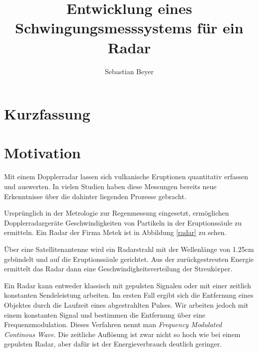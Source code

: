 \documentclass[12pt,a4paper]{scrartcl}
\begin{document}
\title {Entwicklung eines Schwingungsmesssystems für ein Radar}
\author{Sebastian Beyer}
\maketitle
\thispagestyle{empty}
\newpage

\tableofcontents
\thispagestyle{empty}
\newpage




\section{Kurzfassung}

\newpage

\section{Motivation}

Mit einem Dopplerradar lassen sich vulkanische Eruptionen quantitativ erfassen und auswerten. In vielen Studien haben diese Messungen bereits neue Erkenntnisse über die dahinter liegenden Prozesse gebracht. 

Ursprünglich in der Metrologie zur Regenmessung eingesetzt, ermöglichen Dopplerradargeräte Geschwindigkeiten von Partikeln in der Eruptionssäule zu ermitteln. Ein Radar der Firma Metek ist in Abbildung \ref{radar} zu sehen.

Über eine Satellitenantenne wird ein Radarstrahl mit der Wellenlänge von 1.25cm gebündelt und auf die Eruptionssäule gerichtet.
Aus der zurückgestreuten Energie ermittelt das Radar dann eine Geschwindigkeitsverteilung der Streukörper. 

Ein Radar kann entweder klassisch mit gepulsten Signalen oder mit einer zeitlich konstanten Sendeleistung arbeiten.
Im ersten Fall ergibt sich die Entfernung eines Objektes durch die Laufzeit eines abgestrahlten Pulses. 
Wir arbeiten jedoch mit einem konstanten Signal und bestimmen die Entfernung über eine Frequenzmodulation. Dieses Verfahren nennt man \textit{Frequency Modulated Continous Wave}. Die zeitliche Auflösung ist zwar nicht so hoch wie bei einem gepulsten Radar, aber dafür ist der Energieverbrauch deutlich geringer.
\end{document}
